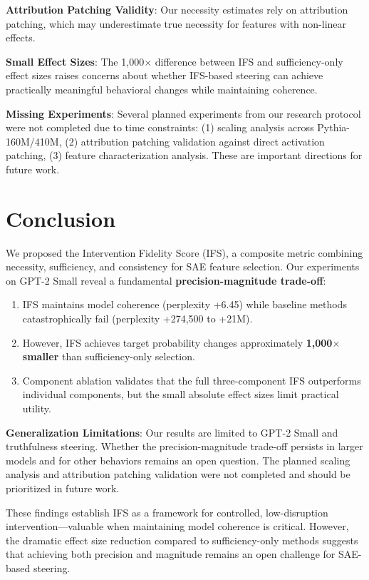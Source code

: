 \documentclass{article}
\begin{document}
\textbf{Attribution Patching Validity}: Our necessity estimates rely on attribution patching, which may underestimate true necessity for features with non-linear effects.

\textbf{Small Effect Sizes}: The 1,000$\times$ difference between IFS and sufficiency-only effect sizes raises concerns about whether IFS-based steering can achieve practically meaningful behavioral changes while maintaining coherence.

\textbf{Missing Experiments}: Several planned experiments from our research protocol were not completed due to time constraints: (1) scaling analysis across Pythia-160M/410M, (2) attribution patching validation against direct activation patching, (3) feature characterization analysis. These are important directions for future work.

\section{Conclusion}
\label{sec:conclusion}

We proposed the Intervention Fidelity Score (IFS), a composite metric combining necessity, sufficiency, and consistency for SAE feature selection. Our experiments on GPT-2 Small reveal a fundamental \textbf{precision-magnitude trade-off}:

\begin{enumerate}
    \item IFS maintains model coherence (perplexity +6.45) while baseline methods catastrophically fail (perplexity +274,500 to +21M).
    \item However, IFS achieves target probability changes approximately \textbf{1,000$\times$ smaller} than sufficiency-only selection.
    \item Component ablation validates that the full three-component IFS outperforms individual components, but the small absolute effect sizes limit practical utility.
\end{enumerate}

\textbf{Generalization Limitations}: Our results are limited to GPT-2 Small and truthfulness steering. Whether the precision-magnitude trade-off persists in larger models and for other behaviors remains an open question. The planned scaling analysis and attribution patching validation were not completed and should be prioritized in future work.

These findings establish IFS as a framework for controlled, low-disruption intervention---valuable when maintaining model coherence is critical. However, the dramatic effect size reduction compared to sufficiency-only methods suggests that achieving both precision and magnitude remains an open challenge for SAE-based steering.
\end{document}
